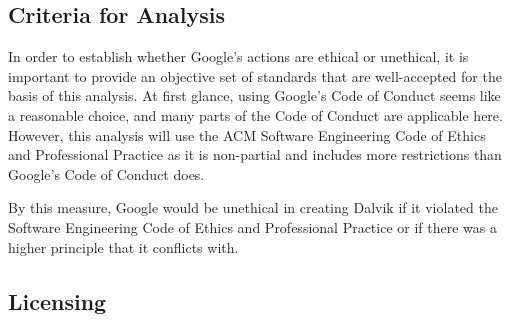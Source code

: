 \documentclass[11pt]{article}
\begin{document}
\begin{multicols}{2}
%
%
%
%

\subsection{Criteria for Analysis} %
\label{sub:analysis_criteria}

In order to establish whether Google's actions are ethical or unethical, it is
important to provide an objective set of standards that are well-accepted for
the basis of this analysis.  At first glance, using Google's Code of Conduct
\cite{google-conduct} seems like a reasonable choice, and many parts of the Code
of Conduct are applicable here.  However, this analysis will use the ACM
Software Engineering Code of Ethics and Professional Practice \cite{secode} as
it is non-partial and includes more restrictions than Google's Code of Conduct
does.

By this measure, Google would be unethical in creating Dalvik if it violated the
Software Engineering Code of Ethics and Professional Practice \cite{secode} or
if there was a higher principle that it conflicts with.


\subsection{Licensing} %
\label{sub:analysis_licensing}


\end{multicols}
\end{document}
